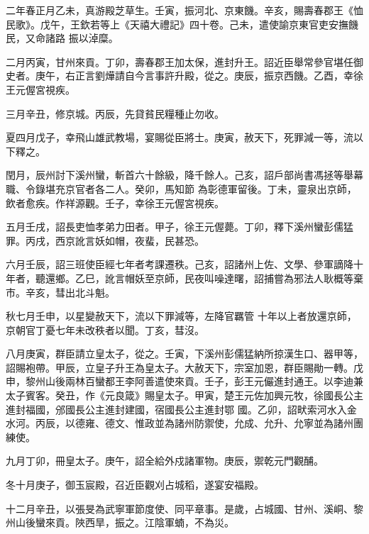 \begin{pinyinscope}
 二年春正月乙未，真游殿芝草生。壬寅，振河北、京東饑。辛亥，賜壽春郡王《恤民歌》。戊午，王欽若等上《天禧大禮記》四十卷。己未，遣使諭京東官吏安撫饑民，又命諸路
 振以淖糜。



 二月丙寅，甘州來貢。丁卯，壽春郡王加太保，進封升王。詔近臣舉常參官堪任御史者。庚午，右正言劉燁請自今言事許升殿，從之。庚辰，振京西饑。乙酉，幸徐王元偓宮視疾。



 三月辛丑，修京城。丙辰，先貸貧民糧種止勿收。



 夏四月戊子，幸飛山雄武教場，宴賜從臣將士。庚寅，赦天下，死罪減一等，流以下釋之。



 閏月，辰州討下溪州蠻，斬首六十餘級，降千餘人。己亥，詔戶部尚書馮拯等舉幕職、令錄堪充京官者各二人。癸卯，馬知節
 為彰德軍留後。丁未，靈泉出京師，飲者愈疾。作祥源觀。壬子，幸徐王元偓宮視疾。



 五月壬戌，詔長吏恤孝弟力田者。甲子，徐王元偓薨。丁卯，釋下溪州蠻彭儒猛罪。丙戌，西京訛言妖如帽，夜蜚，民甚恐。



 六月壬辰，詔三班使臣經七年者考課遷秩。己亥，詔諸州上佐、文學、參軍謫降十年者，聽還鄉。乙巳，訛言帽妖至京師，民夜叫噪達曙，詔捕嘗為邪法人耿概等棄市。辛亥，彗出北斗魁。



 秋七月壬申，以星變赦天下，流以下罪減等，左降官羈管
 十年以上者放還京師，京朝官丁憂七年未改秩者以聞。丁亥，彗沒。



 八月庚寅，群臣請立皇太子，從之。壬寅，下溪州彭儒猛納所掠漢生口、器甲等，詔賜袍帶。甲辰，立皇子升王為皇太子。大赦天下，宗室加恩，群臣賜勛一轉。戊申，黎州山後兩林百蠻都王李阿善遣使來貢。壬子，彭王元儼進封通王。以李迪兼太子賓客。癸丑，作《元良箴》賜皇太子。甲寅，楚王元佐加興元牧，徐國長公主進封福國，邠國長公主進封建國，宿國長公主進封鄂
 國。乙卯，詔畎索河水入金水河。丙辰，以德雍、德文、惟政並為諸州防禦使，允成、允升、允寧並為諸州團練使。



 九月丁卯，冊皇太子。庚午，詔全給外戍諸軍物。庚辰，禦乾元門觀酺。



 冬十月庚子，御玉宸殿，召近臣觀刈占城稻，遂宴安福殿。



 十二月辛丑，以張旻為武寧軍節度使、同平章事。是歲，占城國、甘州、溪峒、黎州山後蠻來貢。陜西旱，振之。江陰軍蝻，不為災。




\end{pinyinscope}
